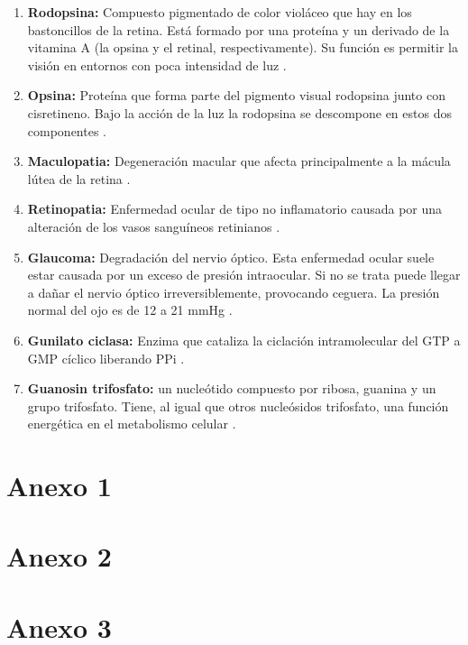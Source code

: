 \documentclass[10pt]{article}
\begin{document}
\begin{enumerate}
\item \textbf{Rodopsina:} Compuesto pigmentado de color violáceo que hay en los bastoncillos de la retina. Está formado por una proteína y un derivado de la vitamina A (la opsina y el retinal, respectivamente). Su función es permitir la visión en entornos con poca intensidad de luz \cite{IEEEreferencias:Ref38}.
\item \textbf{Opsina:} Proteína que forma parte del pigmento visual rodopsina junto con cisretineno. Bajo la acción de la luz la rodopsina se descompone en estos dos componentes \cite{IEEEreferencias:Ref39}.
\item \textbf{Maculopatia:} Degeneración macular que afecta principalmente a la mácula lútea de la retina \cite{IEEEreferencias:Ref38}.
\item \textbf{Retinopatia:} Enfermedad ocular de tipo no inflamatorio causada por una alteración de los vasos sanguíneos retinianos \cite{IEEEreferencias:Ref38}.
\item \textbf{Glaucoma:} Degradación del nervio óptico. Esta enfermedad ocular suele estar causada por un exceso de presión intraocular. Si no se trata puede llegar a dañar el nervio óptico irreversiblemente, provocando ceguera. La presión normal del ojo es de 12 a 21 mmHg \cite{IEEEreferencias:Ref38}.
\item \textbf{Gunilato ciclasa:} Enzima que cataliza la ciclación intramolecular del GTP a GMP cíclico liberando PPi \cite{IEEEreferencias:Ref39}.
\item  \textbf{Guanosin trifosfato:} un nucleótido compuesto por ribosa, guanina y un grupo trifosfato. Tiene, al igual que otros nucleósidos trifosfato, una función energética en el metabolismo celular \cite{IEEEreferencias:Ref39}.

\end{enumerate}
\newpage
 
 

\appendix  
\clearpage %
\addappheadtotoc 
\appendixpage 

\section{Anexo 1}
\newpage
\section{Anexo 2}
\newpage
\section{Anexo 3}
\end{document}
